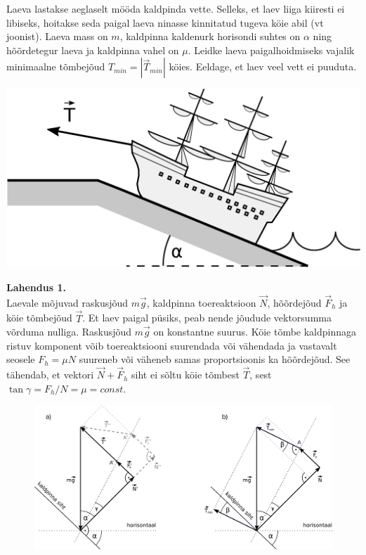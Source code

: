 
Laeva lastakse aeglaselt mööda kaldpinda vette. Selleks, et laev liiga kiiresti ei libiseks, hoitakse seda paigal laeva ninasse kinnitatud tugeva köie abil (vt joonist). Laeva mass on $m$,  kaldpinna kaldenurk horisondi suhtes on $\alpha$ ning hõõrdetegur laeva ja kaldpinna vahel on $\mu$. Leidke laeva paigalhoidmiseks vajalik minimaalne tõmbejõud $T_{min}=|\overrightarrow{T}_{min}|$ köies. Eeldage, et laev veel vett ei puuduta.
\begin{center}
	\includegraphics[width=0.4\linewidth]{2021-v2g-10-yl.pdf}
\end{center}


\hint

\solu
\textbf{Lahendus 1.} \\
Laevale mõjuvad raskusjõud $m\overrightarrow{g}$, kaldpinna toereaktsioon $\overrightarrow{N}$, hõõrdejõud $\overrightarrow{F}_h$ ja köie tõmbejõud $\overrightarrow{T}$. Et laev paigal püsiks, peab nende jõudude vektorsumma võrduma nulliga. Raskusjõud $m\overrightarrow{g}$ on konstantne suurus. Köie tõmbe kaldpinnaga ristuv komponent võib toereaktsiooni suurendada või vähendada ja vastavalt seosele $F_h=\mu N$ suureneb või väheneb samas proportsioonis ka hõõrdejõud. See tähendab, et vektori $\overrightarrow{N}+\overrightarrow{F}_h$ siht ei sõltu köie tõmbest $\overrightarrow{T}$, sest $\tan\gamma=F_h/N=\mu=\textit{const}$.

\begin{figure}[h]
\vspace{-0.0cm}
  \begin{center}
    \includegraphics[width=0.9\linewidth]{2021-v2g-10-sol1.pdf}
  \end{center}
  \vspace{-0.5cm}
\end{figure}

